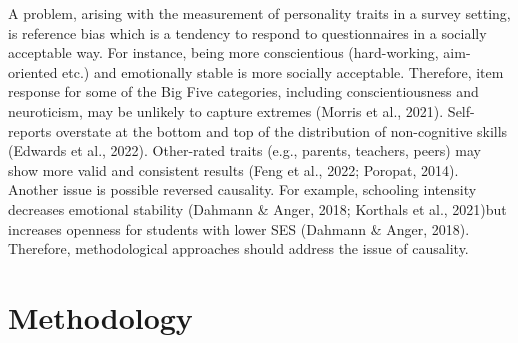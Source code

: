 \documentclass{article}
\begin{document}
A problem, arising with the measurement of personality traits in a
survey setting, is reference bias which is a tendency to respond to
questionnaires in a socially acceptable way. For instance, being more
conscientious (hard-working, aim-oriented etc.) and emotionally stable
is more socially acceptable. Therefore, item response for some of the
Big Five categories, including conscientiousness and neuroticism, may be
unlikely to capture extremes (Morris et al., 2021). Self-reports
overstate at the bottom and top of the distribution of non-cognitive
skills (Edwards et al., 2022). Other-rated traits (e.g., parents,
teachers, peers) may show more valid and consistent results (Feng et
al., 2022; Poropat, 2014). Another issue is possible reversed causality.
For example, schooling intensity decreases emotional stability (Dahmann
\& Anger, 2018; Korthals et al., 2021)but increases openness for
students with lower SES (Dahmann \& Anger, 2018). Therefore,
methodological approaches should address the issue of causality.

\hypertarget{methodology}{%
\section{Methodology}\label{methodology}}
\end{document}
